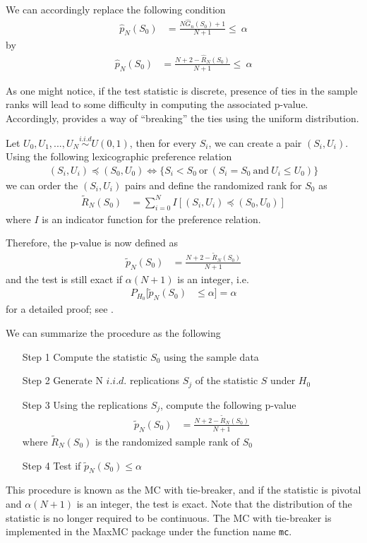 \documentclass[]{article}\usepackage[]{graphicx}\usepackage[]{color}
\newcommand{\pkg}[1]{{\normalfont\fontseries{b}\selectfont #1}}
\let\code=\texttt
\begin{document}
We can accordingly replace the following condition
\begin{align}
\hat{p}_{N}(S_{0}) & = \frac{N\hat{G}_{n}(S_{0})+1}{N+1} \leq\ \alpha
\end{align}
by
\begin{align}
\hat{p}_{N}(S_{0}) & = \frac{N + 2 -\hat{R}_N(S_0)}{N+1} \leq\ \alpha
\end{align}

As one might notice, if the test statistic is discrete, presence of ties in the sample ranks will lead to some difficulty in computing the associated p-value. Accordingly, \cite{dufour_monte_2006} provides a way of ``breaking'' the ties using the uniform distribution.

Let $U_0, U_1,...,U_N \overset{i.i.d}{\sim} U(0,1)$, then for every $S_i$, we can create a pair $(S_i,U_i)$. Using the following lexicographic preference relation
\begin{align}
(S_i,U_i) \preccurlyeq (S_0,U_0) \Longleftrightarrow \{ S_i<S_0 \ \mathrm{or} \ ( S_i = S_0 \ \mathrm{and} \ U_i \leq U_0 ) \}
\end{align}
we can order the $(S_i,U_i)$ pairs and define the randomized rank for $S_0$ as
\begin{align}
\tilde{R}_{N}(S_0) & = \sum_{i=0}^{N}I[(S_i,U_i) \preccurlyeq (S_0,U_0)]
\end{align}
where $I$ is an indicator function for the preference relation.

Therefore, the p-value is now defined as
\begin{align}
\tilde{p}_{N}(S_{0}) & = \frac{N + 2 -\tilde{R}_N(S_0)}{N+1}
\end{align}
and the test is still exact if $\alpha(N+1)$ is an integer, i.e.
\begin{align}
P_{H_{0}}[\tilde{p}_{N}(S_{0}) & \leq\alpha]=\alpha
\end{align}
for a detailed proof; see \citet{dufour_monte_2006}.

We can summarize the procedure as the following
\begin{itemize}
\item[Step 1] Compute the statistic $S_0$ using the sample data
\item[Step 2] Generate N $i.i.d.$ replications $S_{j}$ of the statistic $S$ under $H_0$
\item[Step 3] Using the replications $S_{j}$, compute the following p-value
\begin{align}
\tilde{p}_{N}(S_{0}) & = \frac{N + 2 -\tilde{R}_N(S_0)}{N+1}
\end{align}
where $\tilde{R}_N(S_0)$ is the randomized sample rank of $S_0$
\item[Step 4]  Test if $\tilde{p}_{N}(S_{0})\leq \alpha$
\end{itemize}
This procedure is known as the MC with tie-breaker, and if the statistic is pivotal and $\alpha(N+1)$ is an integer, the test is exact. Note that the distribution of the statistic is no longer required to be continuous. The MC with tie-breaker is implemented in the \pkg{MaxMC} package under the function name \code{mc}.
\end{document}
